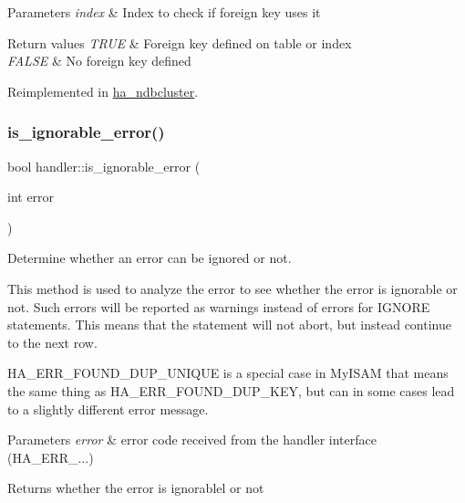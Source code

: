 \begin{DoxyParams}{Parameters}
{\em index} & Index to check if foreign key uses it\\
\hline
\end{DoxyParams}

\begin{DoxyRetVals}{Return values}
{\em T\+R\+UE} & Foreign key defined on table or index \\
\hline
{\em F\+A\+L\+SE} & No foreign key defined \\
\hline
\end{DoxyRetVals}


Reimplemented in \mbox{\hyperlink{classha__ndbcluster_a6adf9b7e7b7357f464a01f9a7ed2a1ee}{ha\+\_\+ndbcluster}}.

\mbox{\label{classhandler_a39c5919d6a3f3098353f4517e2c81037}} 
\subsubsection{\texorpdfstring{is\+\_\+ignorable\+\_\+error()}{is\_ignorable\_error()}}
{\footnotesize\ttfamily bool handler\+::is\+\_\+ignorable\+\_\+error (\begin{DoxyParamCaption}\item[{int}]{error }\end{DoxyParamCaption})\hspace{0.3cm}{\ttfamily [virtual]}}



Determine whether an error can be ignored or not. 

This method is used to analyze the error to see whether the error is ignorable or not. Such errors will be reported as warnings instead of errors for I\+G\+N\+O\+RE statements. This means that the statement will not abort, but instead continue to the next row.

H\+A\+\_\+\+E\+R\+R\+\_\+\+F\+O\+U\+N\+D\+\_\+\+D\+U\+P\+\_\+\+U\+N\+I\+Q\+UE is a special case in My\+I\+S\+AM that means the same thing as H\+A\+\_\+\+E\+R\+R\+\_\+\+F\+O\+U\+N\+D\+\_\+\+D\+U\+P\+\_\+\+K\+EY, but can in some cases lead to a slightly different error message.


\begin{DoxyParams}{Parameters}
{\em error} & error code received from the handler interface (H\+A\+\_\+\+E\+R\+R\+\_\+...)\\
\hline
\end{DoxyParams}
\begin{DoxyReturn}{Returns}
whether the error is ignorablel or not 
\end{DoxyReturn}

